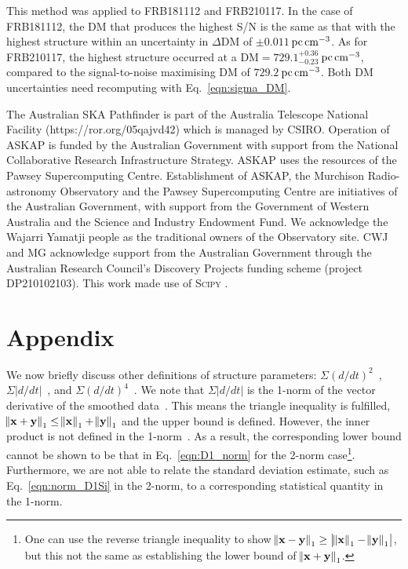 \documentclass[twocolumn]{aastex631}
\newcommand{\pccc}{\ensuremath{{\rm pc}\,{\rm cm}^{-3}}}
\providecommand{\DIFadd}[1]{{\protect\color{BLUE}#1}} %
\providecommand{\DIFaddbegin}{} \providecommand{\DIFaddend}{} %
\newcommand{\DIFaddincludegraphics}[2][]{{\color{blue}\fbox{\DIFOincludegraphics[#1]{#2}}}} %
\DeclareRobustCommand{\DIFaddbegin}{\DIFOaddbegin \let\includegraphics\DIFaddincludegraphics} %
\DeclareRobustCommand{\DIFaddend}{\DIFOaddend \let\includegraphics\DIFOincludegraphics} %
\begin{document}
This method was applied to FRB181112 and  FRB210117. In the case of FRB181112, the DM that produces the highest S/N is the same as that with the highest structure within an uncertainty in $\Delta$DM of $\pm0.011$\,\pccc. As for FRB210117, the highest structure occurred at a  $\text{DM}=729.1_{-0.23}^{+0.36}$\,\pccc, compared to the signal-to-noise maximising DM of $729.2$\,\pccc. \DIFaddbegin \DIFadd{Both DM uncertainties need recomputing with Eq.~\eqref{eqn:sigma_DM}.
}\DIFaddend 


\begin{acknowledgments}
The Australian SKA Pathfinder is part of the Australia Telescope National Facility (https://ror.org/05qajvd42) which is managed by CSIRO. Operation of ASKAP is funded by the Australian Government with support from the National Collaborative Research Infrastructure Strategy. ASKAP uses the resources of the Pawsey Supercomputing Centre. Establishment of ASKAP, the Murchison Radio-astronomy Observatory and the Pawsey Supercomputing Centre are initiatives of the Australian Government, with support from the Government of Western Australia and the Science and Industry Endowment Fund. We acknowledge the Wajarri Yamatji people as the traditional owners of the Observatory site.
CWJ and MG acknowledge support from the Australian Government through the Australian Research Council's Discovery Projects funding scheme (project DP210102103). This work made use of \textsc{Scipy} \citep{SciPy2019}.
\end{acknowledgments}

\section*{Appendix} \label{sec:app}
We now briefly discuss other definitions of structure parameters: $\Sigma \left(d/dt\right)^2$~\citep{Hessels_2019}, $\Sigma \left|d/dt\right|$~\citep{Gajjar_2018}, and $\Sigma \left(d/dt\right)^4$~\citep{Josephy_2019}. We note that $\Sigma \left|d/dt\right|$ is the 1-norm of the vector derivative of the smoothed data~\citep[see Ch.~1]{Strang_LALD2019}. This means the triangle inequality is fulfilled, $\norm{\mathbf{x}+\mathbf{y}}_1\leq\norm{\mathbf{x}}_1+\norm{\mathbf{y}}_1$ and the upper bound is defined. However, the inner product is not defined in the 1-norm~\citep[see. Ch.~1]{Strang_LALD2019}. As a result, the corresponding lower bound cannot be shown to be that in Eq.~\eqref{eqn:D1_norm} for the 2-norm case\footnote{One can use the reverse triangle inequality to show $\norm{\mathbf{x}-\mathbf{y}}_1\geq\left|\norm{\mathbf{x}}_1-\norm{\mathbf{y}}_1\right|$, but this not the same as establishing the lower bound of $\norm{\mathbf{x}+\mathbf{y}}_1$.}. Furthermore, we are not able to relate the standard deviation estimate, such as Eq.~\eqref{eqn:norm_D1Si} in the 2-norm, to a corresponding statistical quantity in the 1-norm.
\end{document}
